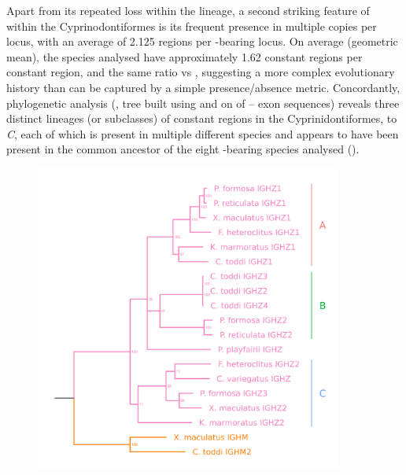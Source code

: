 Apart from its repeated loss within the lineage, a second striking feature of  within the Cyprinodontiformes is its frequent presence in multiple copies per \igh{} locus, with an average of 2.125 regions per -bearing locus. On average (geometric mean), the species analysed have approximately 1.62  constant regions per  constant region, and the same ratio vs , suggesting a more complex evolutionary history than can be captured by a simple presence/absence metric. Concordantly, phylogenetic analysis (, tree built using  and  on of -- exon sequences) reveals three distinct lineages (or subclasses) of  constant regions in the Cyprinidontiformes,  to \textit{C}, each of which is present in multiple different species and appears to have been present in the common ancestor of the eight -bearing species analysed ().

\begin{figure}
	\centering
	\includegraphics[width=0.9\textwidth]{_Figures/png/multispecies-cz-tree}
	\label{fig:multispecies-cz-tree}
\end{figure}

